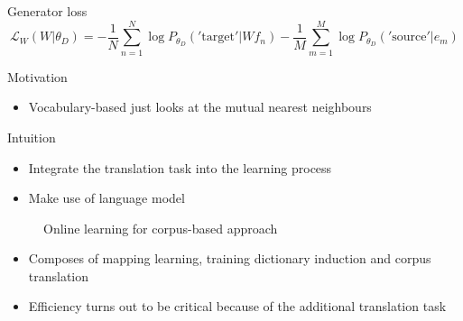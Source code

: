 \documentclass[11pt, a4paper, landscape]{article}
\begin{document}
	
	Generator  loss 
	\[ \mathcal{L}_W(W|\theta_D) = -\frac{1}{N}\sum_{n=1}^{N}\log P_{\theta_D}('\text{target}'| W f_n) - \frac{1}{M}\sum_{m=1}^{M}\log P_{\theta_D}('\text{source}'| e_m)\]
	

	\NewPage
	\vfill
	Motivation
	\begin{itemize}
		\item Vocabulary-based just looks at the mutual nearest neighbours\\
	\end{itemize}
	Intuition
	\begin{itemize}
		\item Integrate the translation task into the learning process
		\item Make use of language model
	\end{itemize}
	\vfill

	
	\NewPage
	\vfill
\begin{figure}[ht]
	\centering
	\begin{minipage}{.7\linewidth}
		\begin{algorithm}[H]
		\SetAlgoLined
		\caption{Online learning for corpus-based approach}
		\end{algorithm}
	\end{minipage}
\end{figure}


	\vfill	
	\begin{itemize}
		\item Composes of mapping learning, training dictionary induction and corpus translation
		\item Efficiency turns out to be critical because of the additional translation task 
	\end{itemize}
\end{document}
